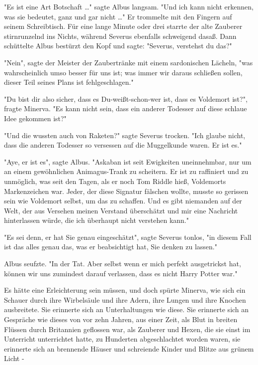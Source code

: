 {"Es ist eine Art Botschaft …" sagte Albus langsam. "Und ich kann nicht erkennen, was sie bedeutet, ganz und gar nicht …" Er trommelte mit den Fingern auf seinem Schreibtisch. Für eine lange Minute oder drei starrte der alte Zauberer stirnrunzelnd ins Nichts, während Severus ebenfalls schweigend dasaß. Dann schüttelte Albus bestürzt den Kopf und sagte: "Severus, verstehst du das?"

"Nein", sagte der Meister der Zaubertränke mit einem sardonischen Lächeln, "was wahrscheinlich umso besser für uns ist; was immer wir daraus schließen sollen, dieser Teil seines Plans ist fehlgeschlagen."

"Du bist dir also sicher, dass es Du-weißt-schon-wer ist, dass es Voldemort ist?", fragte Minerva. "Es kann nicht sein, dass ein anderer Todesser auf diese schlaue Idee gekommen ist?"

"Und die wussten auch von Raketen?" sagte Severus trocken. "Ich glaube nicht, dass die anderen Todesser so versessen auf die Muggelkunde waren. Er ist es."

"Aye, er ist es", sagte Albus. "Askaban ist seit Ewigkeiten uneinnehmbar, nur um an einem gewöhnlichen Animagus-Trank zu scheitern. Er ist zu raffiniert und zu unmöglich, was seit den Tagen, als er noch Tom Riddle hieß, Voldemorts Markenzeichen war. Jeder, der diese Signatur fälschen wollte, musste so gerissen sein wie Voldemort selbst, um das zu schaffen. Und es gibt niemanden auf der Welt, der aus Versehen meinen Verstand überschätzt und mir eine Nachricht hinterlassen würde, die ich überhaupt nicht verstehen kann."

"Es sei denn, er hat Sie genau eingeschätzt", sagte Severus tonlos, "in diesem Fall ist das alles genau das, was er beabsichtigt hat, Sie denken zu lassen."

Albus seufzte. "In der Tat. Aber selbst wenn er mich perfekt ausgetrickst hat, können wir uns zumindest darauf verlassen, dass es nicht Harry Potter war."

Es hätte eine Erleichterung sein müssen, und doch spürte Minerva, wie sich ein Schauer durch ihre Wirbelsäule und ihre Adern, ihre Lungen und ihre Knochen ausbreitete. Sie erinnerte sich an Unterhaltungen wie diese. Sie erinnerte sich an Gespräche wie dieses von vor zehn Jahren, aus einer Zeit, als Blut in breiten Flüssen durch Britannien geflossen war, als Zauberer und Hexen, die sie einst im Unterricht unterrichtet hatte, zu Hunderten abgeschlachtet worden waren, sie erinnerte sich an brennende Häuser und schreiende Kinder und Blitze aus grünem Licht -

}
